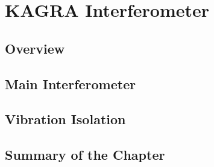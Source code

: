 \chapter{KAGRA Interferometer}



\section{Overview}
\subsection{}
\subsection{}
\section{Main Interferometer}
\subsection{}
\subsection{}
\section{Vibration Isolation}
\subsection{}
\subsection{}



\section{Summary of the Chapter}
